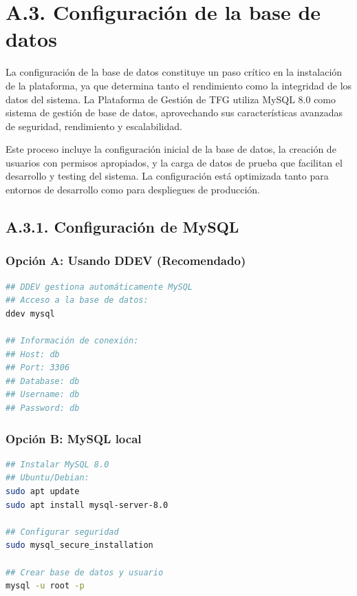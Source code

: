 \documentclass[12pt,a4paper,oneside]{report}
\begin{document}
{\section{A.3. Configuración de la base de
datos}\label{a.3.-configuraciuxf3n-de-la-base-de-datos}

La configuración de la base de datos constituye un paso crítico en la
instalación de la plataforma, ya que determina tanto el rendimiento como
la integridad de los datos del sistema. La Plataforma de Gestión de TFG
utiliza MySQL 8.0 como sistema de gestión de base de datos, aprovechando
sus características avanzadas de seguridad, rendimiento y escalabilidad.

Este proceso incluye la configuración inicial de la base de datos, la
creación de usuarios con permisos apropiados, y la carga de datos de
prueba que facilitan el desarrollo y testing del sistema. La
configuración está optimizada tanto para entornos de desarrollo como
para despliegues de producción.

\subsection{A.3.1. Configuración de
MySQL}\label{a.3.1.-configuraciuxf3n-de-mysql}

\subsubsection{Opción A: Usando DDEV
(Recomendado)}\label{opciuxf3n-a-usando-ddev-recomendado}

\begin{lstlisting}[language=bash]
## DDEV gestiona automáticamente MySQL
## Acceso a la base de datos:
ddev mysql

## Información de conexión:
## Host: db
## Port: 3306  
## Database: db
## Username: db
## Password: db
\end{lstlisting}

\subsubsection{Opción B: MySQL local}\label{opciuxf3n-b-mysql-local}

\begin{lstlisting}[language=bash]
## Instalar MySQL 8.0
## Ubuntu/Debian:
sudo apt update
sudo apt install mysql-server-8.0

## Configurar seguridad
sudo mysql_secure_installation

## Crear base de datos y usuario
mysql -u root -p
\end{lstlisting}

}
\end{document}
